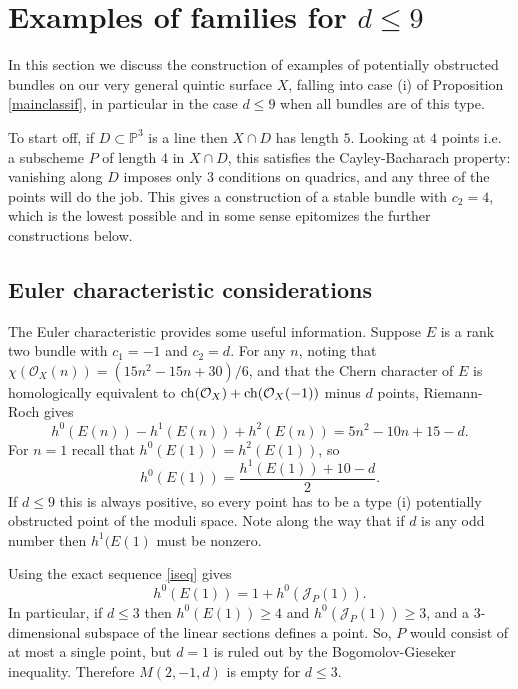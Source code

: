 \documentclass{amsart}
\theoremstyle{plain}
\numberwithin{equation}{section}
\begin{document}
\section{Examples of families for $d\leq 9$}
\label{sec6}

In this section we discuss the construction of
examples of potentially obstructed bundles on our very general quintic surface $X$, 
falling into case (i) of Proposition \ref{mainclassif}, in particular in the case
$d\leq 9$ when all bundles are of this type.  

To start off, if $D\subset {{\mathbb P}} ^3$ is a line then $X\cap D$ has length $5$.
Looking at 
$4$ points i.e. a subscheme $P$ of length $4$ in $X\cap D$, this satisfies the Cayley-Bacharach property: 
vanishing along $D$ imposes only $3$ conditions on quadrics, and any three of the
points will do the job. This gives a construction of a stable bundle with
$c_2=4$, which is the lowest possible and 
in some sense epitomizes the further constructions below. 

\subsection{Euler characteristic considerations}
\label{sec-euler}

The Euler characteristic provides some useful information.
Suppose $E$ is a rank two bundle with $c_1=-1$ and $c_2=d$. For any $n$, noting that $\chi ({{\mathcal O}} _X(n)) = (15n^2 -15n +30)/6$,
and that the Chern character of $E$ is homologically 
equivalent to ${\rm ch} ({{\mathcal O}} _X) +{\rm ch}( {{\mathcal O}} _X(-1))$ minus $d$ points, Riemann-Roch gives
\begin{equation}
\label{euler}
h^0(E(n))-h^1(E(n)) + h^2(E(n)) = 5n^2 - 10 n + 15 -d.  
\end{equation}
For $n=1$ recall that $h^0(E(1)) = h^2(E(1))$, so
\begin{equation}
\label{euler2}
h^0(E(1)) = \frac{h^1(E(1)) + 10 -d}{2}.
\end{equation}
If $d\leq 9$ this is always positive, so every point has to be
a type (i) potentially obstructed point of the moduli space. Note along the way that if $d$ is any odd
number then $h^1(E(1)$ must be nonzero. 

Using the exact sequence \ref{iseq} gives
$$
h^0(E(1)) = 1 + h^0({{\mathcal J}} _P (1)).
$$
In particular, if $d\leq 3$ then $h^0(E(1))\geq 4$ and 
$h^0({{\mathcal J}} _P (1))\geq 3$, and a $3$-dimensional subspace of the linear
sections defines a point. 
So, $P$ would consist of at most a single point,
but $d=1$ is ruled out by the Bogomolov-Gieseker inequality. Therefore 
$M(2,-1,d)$ is empty for $d\leq 3$. 
\end{document}
